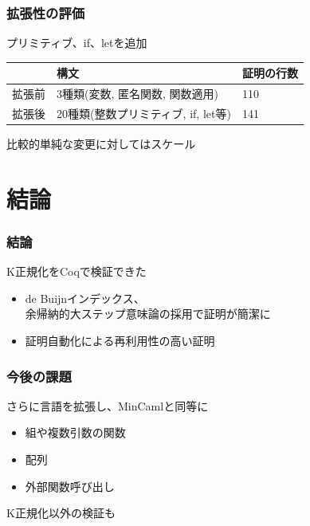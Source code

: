 \documentclass[dvipdfmx,cjk,xcolor=dvipsnames,envcountsect,notheorems,12pt]{beamer}
\theoremstyle{definition}
\begin{document}
\begin{frame}
	\frametitle{拡張性の評価}
	\LARGE プリミティブ、if、letを追加
	\begin{center}
		\normalsize
		\begin{tabular}{l|ll}
			 & 構文 & 証明の行数 \\
			\hline
			拡張前 & 3種類(変数, 匿名関数, 関数適用) & 110 \\
			拡張後 & 20種類(整数プリミティブ, if, let等) & 141 \\
		\end{tabular}
	\end{center}

	\vfill

	{\Large 比較的単純な変更に対してはスケール}
\end{frame}

\section{結論}

\begin{frame}
	\frametitle{結論}
	\Large K正規化をCoqで検証できた
	\begin{itemize}
		\item de Buijnインデックス、\\余帰納的大ステップ意味論の採用で証明が簡潔に
		\item 証明自動化による再利用性の高い証明
	\end{itemize}
\end{frame}

\begin{frame}
	\frametitle{今後の課題}
	\Large さらに言語を拡張し、MinCamlと同等に
	\begin{itemize}
		\item 組や複数引数の関数
		\item 配列
		\item 外部関数呼び出し
	\end{itemize}

	\vfill

	K正規化以外の検証も
\end{frame}
\end{document}
